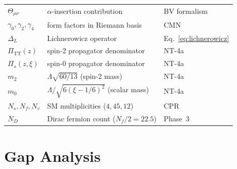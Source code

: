 \documentclass[12pt,a4paper]{article}
\theoremstyle{definition}
\theoremstyle{remark}
\begin{document}
\begin{center}
\begin{longtable}{lll}
$\Theta_{\mu\nu}$ & $\alpha$-insertion contribution & BV formalism \\
$\gamma_0, \gamma_2, \gamma_4$ & form factors in Riemann basis & CMN \\
$\Delta_L$ & Lichnerowicz operator & Eq.~\eqref{eq:lichnerowicz} \\
$\Pi_{\mathrm{TT}}(z)$ & spin-2 propagator denominator & NT-4a \\
$\Pi_s(z,\xi)$ & spin-0 propagator denominator & NT-4a \\
$m_2$ & $\Lambda\sqrt{60/13}$ (spin-2 mass) & NT-4a \\
$m_0$ & $\Lambda/\sqrt{6(\xi-1/6)^2}$ (scalar mass) & NT-4a \\
$N_s, N_f, N_v$ & SM multiplicities ($4, 45, 12$) & CPR \\
$N_D$ & Dirac fermion count ($N_f/2 = 22.5$) & Phase~3 \\
\bottomrule
\end{longtable}
\end{center}


\section{Gap Analysis}
\label{sec:gaps}
\end{document}
